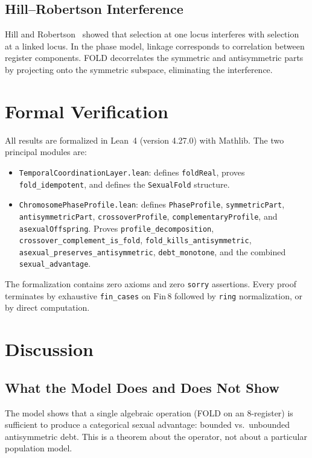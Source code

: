 \documentclass[11pt,twocolumn]{article}
\begin{document}
\subsection{Hill--Robertson Interference}

Hill and Robertson~\cite{Hill1966} showed that selection at one locus
interferes with selection at a linked locus. In the phase model, linkage
corresponds to correlation between register components. FOLD decorrelates
the symmetric and antisymmetric parts by projecting onto the symmetric
subspace, eliminating the interference.

\section{Formal Verification}

All results are formalized in Lean~4 (version 4.27.0) with Mathlib. The
two principal modules are:

\begin{itemize}
\item \texttt{TemporalCoordinationLayer.lean}: defines \texttt{foldReal},
  proves \texttt{fold\_idempotent}, and defines the
  \texttt{SexualFold} structure.
\item \texttt{ChromosomePhaseProfile.lean}: defines
  \texttt{PhaseProfile}, \texttt{symmetricPart},
  \texttt{antisymmetricPart}, \texttt{crossoverProfile},
  \texttt{complementaryProfile}, and \texttt{asexualOffspring}. Proves
  \texttt{profile\_decomposition},
  \texttt{crossover\_complement\_is\_fold},
  \texttt{fold\_kills\_antisymmetric},
  \texttt{asexual\_preserves\_antisymmetric},
  \texttt{debt\_monotone}, and the combined
  \texttt{sexual\_advantage}.
\end{itemize}

The formalization contains zero axioms and zero \texttt{sorry} assertions.
Every proof terminates by exhaustive \texttt{fin\_cases} on
$\mathrm{Fin}\,8$ followed by \texttt{ring} normalization, or by direct
computation.

\section{Discussion}

\subsection{What the Model Does and Does Not Show}

The model shows that a single algebraic operation (FOLD on an 8-register)
is sufficient to produce a categorical sexual advantage: bounded vs.\
unbounded antisymmetric debt. This is a theorem about the operator, not
about a particular population model.
\end{document}
